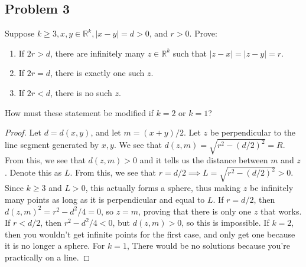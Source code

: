 \documentclass{amsart}
\begin{document}
\subsection*{Problem 3} Suppose $k \geq 3, x,y \in \mathbb{R}^k, |x-y| = d > 0$, and $r > 0$. Prove: 
\begin{enumerate}[label=(\alph*)]
    \item If $2r > d$, there are infinitely many $z \in \mathbb{R}^k$ such that $|z-x|=|z-y|=r$.
    \item If $2r = d$, there is exactly one such $z$.
    \item If $2r < d$, there is no such $z$.
\end{enumerate}
How must these statement be modified if $k = 2$ or $k = 1$?
\begin{proof}
     Let $d = d(x,y)$, and let $m= (x+y)/2$. Let $z$ be perpendicular to the line segment generated by $x,y$. We see that $d(z,m) =\sqrt{r^2-(d/2)^2}=R$. From this, we see that $d(z,m)>0$ and it tells us the distance between $m$ and $z$. Denote this as $L$. From this, we see that $r = d/2 \implies L = \sqrt{r^2 - (d/2)^2} > 0$. Since $k \geq 3$ and $L > 0$, this actually forms a sphere, thus making $z$ be infinitely many points as long as it is perpendicular and equal to $L$. 
     If $r = d/2$, then $d(z,m)^2 = r^2 - d^2/4 = 0$, so $z = m$, proving that there is only one $z$ that works. 
     If $r < d/2$, then $r^2 - d^2/4 < 0$, but $d(z,m) > 0$, so this is impossible. 
     If $k=2$, then you wouldn't get infinite points for the first case, and only get one because it is no longer a sphere. 
     For $k =1$, There would be no solutions because you're practically on a line. 
\end{proof}
\end{document}
